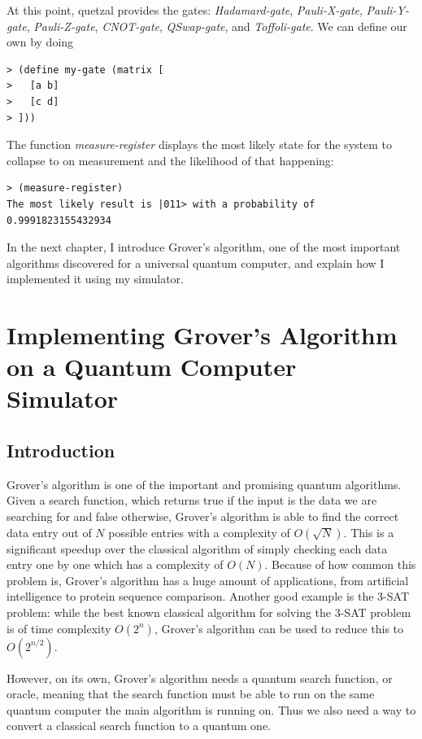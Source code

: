 \documentclass[11pt]{report}
\newcommand{\?}{\stackrel{?}{=}}
\begin{document}
At this point, quetzal provides the gates: \textit{Hadamard-gate}, \textit{Pauli-X-gate}, \textit{Pauli-Y-gate}, \textit{Pauli-Z-gate}, \textit{CNOT-gate}, \textit{QSwap-gate}, and \textit{Toffoli-gate}. We can define our own by doing

\begin{lstlisting}
> (define my-gate (matrix [
> 	[a b]
> 	[c d]
> ]))
\end{lstlisting}

The function \textit{measure-register} displays the most likely state for the system to collapse to on measurement and the likelihood of that happening:

\begin{lstlisting}
> (measure-register)
The most likely result is |011> with a probability of 0.9991823155432934
\end{lstlisting}

In the next chapter, I introduce Grover's algorithm, one of the most important algorithms discovered for a universal quantum computer, and explain how I implemented it using my simulator.

\chapter{Implementing Grover's Algorithm on a Quantum Computer Simulator}

\section{Introduction}

Grover's algorithm is one of the important and promising quantum algorithms. Given a search function, which returns true if the input is the data we are searching for and false otherwise, Grover's algorithm is able to find the correct data entry out of $N$ possible entries with a complexity of $O(\sqrt{N})$. This is a significant speedup over the classical algorithm of simply checking each data entry one by one which has a complexity of $O(N)$. Because of how common this problem is, Grover's algorithm has a huge amount of applications, from artificial intelligence to protein sequence comparison. Another good example is the 3-SAT problem: while the best known classical algorithm for solving the 3-SAT problem is of time complexity $O(2^{n})$, Grover's algorithm can be used to reduce this to $O(2^{n/2})$.

However, on its own, Grover's algorithm needs a quantum search function, or oracle, meaning that the search function must be able to run on the same quantum computer the main algorithm is running on. Thus we also need a way to convert a classical search function to a quantum one.
\end{document}
